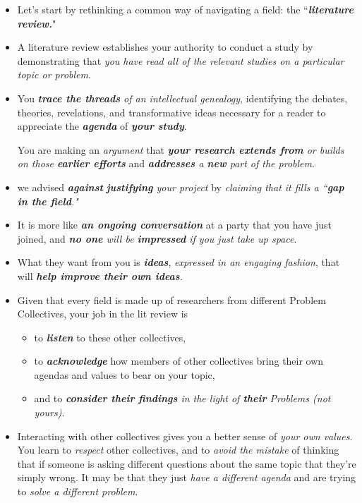 \documentclass[11pt]{article}
\begin{document}
\begin{itemize}
\item Let’s start by rethinking a common way of navigating a field: the ``\emph{\textbf{literature review.}}"

\item A literature review establishes your authority to conduct a study by demonstrating that \emph{you have read all of the relevant studies on a particular topic or problem}. 

\item You \emph{\textbf{trace the threads} of an intellectual genealogy}, identifying the debates, theories, revelations, and transformative ideas necessary for a reader to appreciate the \emph{\textbf{agenda}} of \emph{\textbf{your study}}. 

You are making an \emph{argument} that \emph{\textbf{your research extends from} or builds on those \textbf{earlier efforts}} and \emph{\textbf{addresses} a \textbf{new} part of the problem}.

\item we advised \emph{\textbf{against}} \emph{\textbf{justifying} your project} by \emph{claiming that it fills a ``\textbf{gap in the field}."}

\item It is more like \emph{\textbf{an ongoing conversation}} at a party that you have just joined, and \emph{\textbf{no one} will be \textbf{impressed} if you just take up space}. 

\item What they want from you is \textbf{\emph{ideas}}, \emph{expressed in an engaging fashion}, that will \emph{\textbf{help improve their own ideas}}.

\item Given that every field is made up of researchers from different Problem Collectives, your job in the lit review is
\begin{itemize}
\item to \emph{\textbf{listen}} to these other collectives, 
\item to \emph{\textbf{acknowledge}} how members of other collectives bring their own agendas and values to bear on your topic,
\item and to \emph{\textbf{consider their findings} in the light of \textbf{their} Problems (not yours)}.
\end{itemize}

\item Interacting with other collectives gives you a better sense of \emph{your own values}. You learn to \emph{respect} other collectives, and to \emph{avoid the mistake} of thinking that if someone is asking different questions about the same topic that they’re simply wrong. It may be that they just \emph{have a different agenda} and are trying to \emph{solve a different problem}.


\end{itemize}
\end{document}
